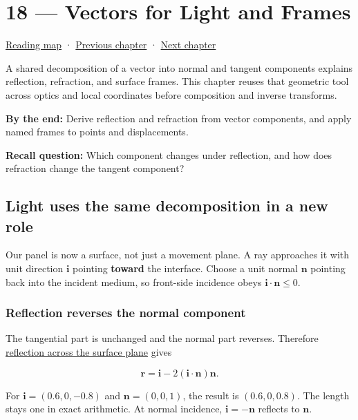 \hypertarget{01-foundations-i-ch018}{}
\chapter{18 --- Vectors for Light and Frames}\label{01-foundations-i-ch018-vectors-for-light-and-frames}

\hyperref[volume-reading-map]{Reading map} · \hyperref[01-foundations-i-ch017-python-and-numerical-tools-for-graphics-systems]{Previous chapter} · \hyperref[01-foundations-i-ch019-coordinate-frames-and-linear-systems]{Next chapter}

A shared decomposition of a vector into normal and tangent components explains reflection, refraction, and surface frames. This chapter reuses that geometric tool across optics and local coordinates before composition and inverse transforms.

\textbf{By the end:} Derive reflection and refraction from vector components, and apply named frames to points and displacements.

\textbf{Recall question:} Which component changes under reflection, and how does refraction change the tangent component?

\section{Light uses the same decomposition in a new role}\label{01-foundations-i-ch018-light-uses-the-same-decomposition-in-a-new-role}

Our panel is now a surface, not just a movement plane. A ray approaches it with unit direction \(\mathbf i\) pointing \textbf{toward} the interface. Choose a unit normal \(\mathbf n\) pointing back into the incident medium, so front-side incidence obeys \(\mathbf i\cdot\mathbf n\le0\).

\subsection{Reflection reverses the normal component}\label{01-foundations-i-ch018-reflection-reverses-the-normal-component}

The tangential part is unchanged and the normal part reverses. Therefore \hyperref[01-foundations-i-ch018-light-uses-the-same-decomposition-in-a-new-role]{reflection across the surface plane} gives

\[
\mathbf r=\mathbf i-2(\mathbf i\cdot\mathbf n)\mathbf n.
\]

For \(\mathbf i=(0.6,0,-0.8)\) and \(\mathbf n=(0,0,1)\), the result is \((0.6,0,0.8)\). The length stays one in exact arithmetic. At normal incidence, \(\mathbf i=-\mathbf n\) reflects to \(\mathbf n\).

